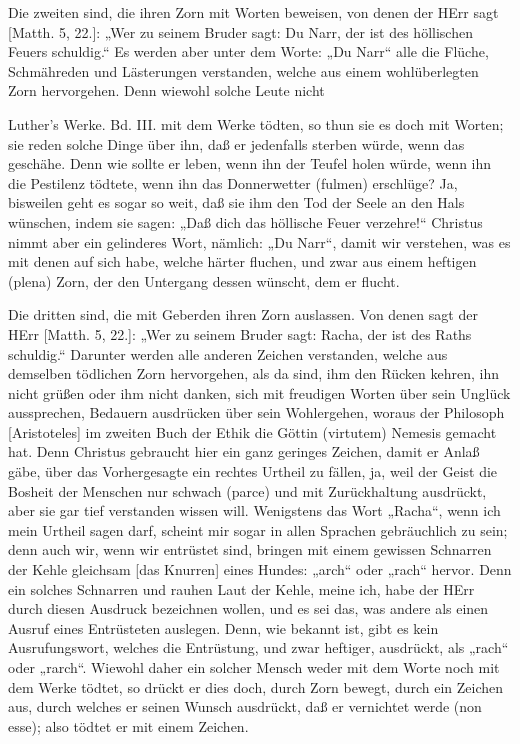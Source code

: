 Die zweiten sind, die ihren Zorn mit Worten beweisen, von denen der HErr sagt [Matth. 5, 22.]: „Wer zu seinem Bruder sagt: Du Narr, der ist des höllischen Feuers schuldig.“ Es werden aber unter dem Worte: „Du Narr“ alle die Flüche, Schmähreden und Lästerungen verstanden, welche aus einem wohlüberlegten Zorn hervorgehen. Denn wiewohl solche Leute nicht

Luther's Werke. Bd. III.
mit dem Werke tödten, so thun sie es doch mit Worten; sie reden solche Dinge über ihn, daß er jedenfalls sterben würde, wenn das geschähe. Denn wie sollte er leben, wenn ihn der Teufel holen würde, wenn ihn die Pestilenz tödtete, wenn ihn das Donnerwetter (fulmen) erschlüge? Ja, bisweilen geht es sogar so weit, daß sie ihm den Tod der Seele an den Hals wünschen, indem sie sagen: „Daß dich das höllische Feuer verzehre!“ Christus nimmt aber ein gelinderes Wort, nämlich: „Du Narr“, damit wir verstehen, was es mit denen auf sich habe, welche härter fluchen, und zwar aus einem heftigen (plena) Zorn, der den Untergang dessen wünscht, dem er flucht.

Die dritten sind, die mit Geberden ihren Zorn auslassen. Von denen sagt der HErr [Matth. 5, 22.]: „Wer zu seinem Bruder sagt: Racha, der ist des Raths schuldig.“ Darunter werden alle anderen Zeichen verstanden, welche aus demselben tödlichen Zorn hervorgehen, als da sind, ihm den Rücken kehren, ihn nicht grüßen oder ihm nicht danken, sich mit freudigen Worten über sein Unglück aussprechen, Bedauern ausdrücken über sein Wohlergehen, woraus der Philosoph [Aristoteles] im zweiten Buch der Ethik die Göttin (virtutem) Nemesis gemacht hat. Denn Christus gebraucht hier ein ganz geringes Zeichen, damit er Anlaß gäbe, über das Vorhergesagte ein rechtes Urtheil zu fällen, ja, weil der Geist die Bosheit der Menschen nur schwach (parce) und mit Zurückhaltung ausdrückt, aber sie gar tief verstanden wissen will. Wenigstens das Wort „Racha“, wenn ich mein Urtheil sagen darf, scheint mir sogar in allen Sprachen gebräuchlich zu sein; denn auch wir, wenn wir entrüstet sind, bringen mit einem gewissen Schnarren der Kehle gleichsam [das Knurren] eines Hundes: „arch“ oder „rach“ hervor. Denn ein solches Schnarren und rauhen Laut der Kehle, meine ich, habe der HErr durch diesen Ausdruck bezeichnen wollen, und es sei das, was andere als einen Ausruf eines Entrüsteten auslegen. Denn, wie bekannt ist, gibt es kein Ausrufungswort, welches die Entrüstung, und zwar heftiger, ausdrückt, als „rach“ oder „rarch“. Wiewohl daher ein solcher Mensch weder mit dem Worte noch mit dem Werke tödtet, so drückt er dies doch, durch Zorn bewegt, durch ein Zeichen aus, durch welches er seinen Wunsch ausdrückt, daß er vernichtet werde (non esse); also tödtet er mit einem Zeichen.

